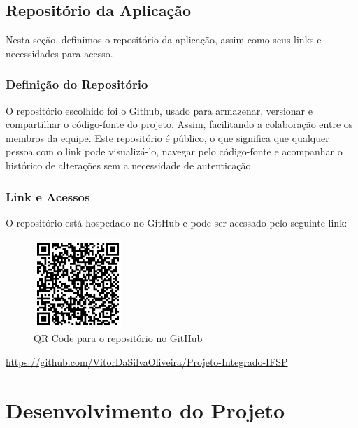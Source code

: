 \documentclass[
	12pt,				%
	openany,			%
	twoside,			%
	a4paper,			%
	english,			%
	brazil				%
	]{abntex2}
\begin{document}
\section{Repositório da Aplicação}

Nesta seção, definimos o repositório da aplicação, assim como seus links e necessidades para acesso.

\subsection{Definição do Repositório}

O repositório escolhido foi o Github, usado para armazenar, versionar e compartilhar o código-fonte do projeto. Assim, facilitando a colaboração entre os membros da equipe. Este repositório é público, o que significa que qualquer pessoa com o link pode visualizá-lo, navegar pelo código-fonte e acompanhar o histórico de alterações sem a necessidade de autenticação.

\subsection{Link e Acessos}

O repositório está hospedado no GitHub e pode ser acessado pelo seguinte link:

\begin{figure}[h!]
    \centering
    \includegraphics[width=0.3\textwidth]{Figuras/QR-CODE-GitHub.png}
    \caption{QR Code para o repositório no GitHub}
\end{figure}

\begin{center}
    \href{https://github.com/VitorDaSilvaOliveira/Projeto-Integrado-IFSP}{https://github.com/VitorDaSilvaOliveira/Projeto-Integrado-IFSP}
\end{center}

\chapter{Desenvolvimento do Projeto}
\end{document}
